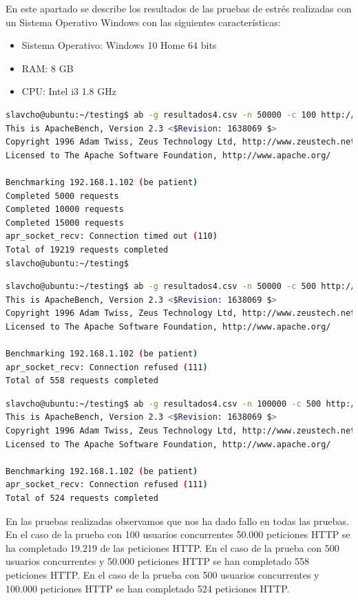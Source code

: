 En este apartado se describe los resultados de las pruebas de estrés realizadas con un Sistema Operativo Windows con las siguientes características:

\begin{itemize}
	\item Sistema Operativo: Windows 10 Home 64 bits
	\item RAM: 8 GB
	\item CPU: Intel i3 1.8 GHz
\end{itemize}

\begin{lstlisting}[language=bash]
slavcho@ubuntu:~/testing$ ab -g resultados4.csv -n 50000 -c 100 http://192.168.1.102:81/
This is ApacheBench, Version 2.3 <$Revision: 1638069 $>
Copyright 1996 Adam Twiss, Zeus Technology Ltd, http://www.zeustech.net/
Licensed to The Apache Software Foundation, http://www.apache.org/

Benchmarking 192.168.1.102 (be patient)
Completed 5000 requests
Completed 10000 requests
Completed 15000 requests
apr_socket_recv: Connection timed out (110)
Total of 19219 requests completed
slavcho@ubuntu:~/testing$
\end{lstlisting}

\begin{lstlisting}[language=bash]
slavcho@ubuntu:~/testing$ ab -g resultados4.csv -n 50000 -c 500 http://192.168.1.102:81/
This is ApacheBench, Version 2.3 <$Revision: 1638069 $>
Copyright 1996 Adam Twiss, Zeus Technology Ltd, http://www.zeustech.net/
Licensed to The Apache Software Foundation, http://www.apache.org/

Benchmarking 192.168.1.102 (be patient)
apr_socket_recv: Connection refused (111)
Total of 558 requests completed
\end{lstlisting}


\begin{lstlisting}[language=bash]
slavcho@ubuntu:~/testing$ ab -g resultados4.csv -n 100000 -c 500 http://192.168.1.102:81/
This is ApacheBench, Version 2.3 <$Revision: 1638069 $>
Copyright 1996 Adam Twiss, Zeus Technology Ltd, http://www.zeustech.net/
Licensed to The Apache Software Foundation, http://www.apache.org/

Benchmarking 192.168.1.102 (be patient)
apr_socket_recv: Connection refused (111)
Total of 524 requests completed
\end{lstlisting}

En las pruebas realizadas observamos que nos ha dado fallo en todas las pruebas. En el caso de la prueba con 100 usuarios concurrentes 50.000 peticiones HTTP se ha completado 19.219 de las peticiones HTTP. En el caso de la prueba con 500 usuarios concurrentes y 50.000 peticiones HTTP se han completado 558 peticiones HTTP. En el caso de la prueba con 500 usuarios concurrentes y 100.000 peticiones HTTP se han completado 524 peticiones HTTP. 

